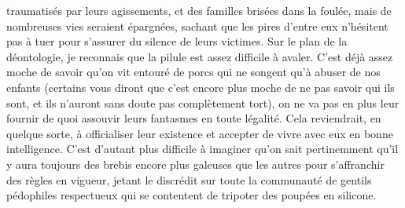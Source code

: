 traumatisés par leurs agissements, et des familles brisées dans la foulée, mais de nombreuses vies seraient épargnées, sachant que les pires d’entre eux n’hésitent pas à tuer pour s’assurer du silence de leurs victimes. Sur le plan de la déontologie, je reconnais que la pilule est assez difficile à avaler. C’est déjà assez moche de savoir qu’on vit entouré de porcs qui ne songent qu’à abuser de nos enfants (certains vous diront que c’est encore plus moche de ne pas savoir qui ils sont, et ils n’auront sans doute pas complètement tort), on ne va pas en plus leur fournir de quoi assouvir leurs fantasmes en toute légalité. Cela reviendrait, en quelque sorte, à officialiser leur existence et accepter de vivre avec eux en bonne intelligence. C’est d’autant plus difficile à imaginer qu’on sait pertinemment qu’il y aura toujours des brebis encore plus galeuses que les autres pour s’affranchir des règles en vigueur, jetant le discrédit sur toute la communauté de gentils pédophiles respectueux qui se contentent de tripoter des poupées en silicone.

